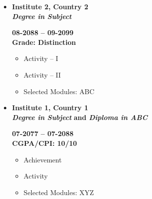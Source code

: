 \vspace{-0.5cm}
\makebox[\linewidth]{\rule{\linewidth}{1.1pt}}
\vspace{-0.5cm}
\begin{itemize} %
	\item \begin{multicols}{2}	
		\begin{flushleft}
			\textbf{Institute 2, Country 2}  \\
			\textbf{\textit{Degree in Subject}}
		\end{flushleft}
		\columnbreak
		\begin{flushright}
			\textbf{08-2088 -- 09-2099}  \\
			\textbf{Grade: \textbf{Distinction}}
		\end{flushright}
	\end{multicols}
	\vspace{-0.25cm}
	\begin{itemize}
		\item Activity -- I
		\item Activity -- II
		\item Selected Modules: ABC
	\end{itemize}
	\vspace{-0.25cm}
	\item \begin{multicols}{2}
		\begin{flushleft}
			\textbf{Institute 1, Country 1} \\
			\textbf{\textit{Degree in Subject}} \textbf{and \textit{Diploma in ABC}}
		\end{flushleft}
		\columnbreak
		\begin{flushright}
			\textbf{07-2077 -- 07-2088 } \\
			\textbf{CGPA/CPI: 10/10}
		\end{flushright}
	\end{multicols}
	\vspace{-0.25cm}
	\begin{itemize}
		\item Achievement
		\item Activity
		\item Selected Modules: XYZ
	\end{itemize}
\end{itemize}
